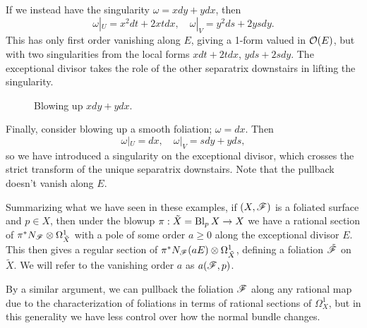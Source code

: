 \begin{example}
    If we instead have the singularity $\omega=xdy+ydx$, then
    \begin{equation*}
        \omega|_U = x^2dt + 2xtdx, \quad
        \omega|_V = y^2ds+2ysdy.
    \end{equation*}
    This has only first order vanishing along $E$, giving a 1-form valued in
    $\mathcal{O}(E)$, but with two singularities from the local forms $xdt+2tdx$,
    $yds+2sdy$. The exceptional divisor takes the role of the other separatrix
    downstairs in lifting the singularity.
    \begin{figure}[H]
        \centering
        \caption{Blowing up $xdy+ydx$.}
    \end{figure}
\end{example}

\begin{example}\label{ex:smooth blowup}
    Finally, consider blowing up a smooth foliation; $\omega=dx$. Then
    \begin{equation*}
        \omega|_U = dx, \quad \omega|_V = sdy+yds,
    \end{equation*}
    so we have introduced a singularity on the exceptional divisor, which
    crosses the strict transform of the unique separatrix downstairs. Note that
    the pullback doesn't vanish along $E$.
\end{example}

\begin{definition}
    Summarizing what we have seen in these examples, if $(X,\mathscr{F})$ is a
    foliated surface and $p\in X$, then under the blowup
    $\pi:\tilde X=\operatorname{Bl}_pX\to X$ we have a rational section of
    $\pi^*N_{\mathscr{F}}\otimes\Omega^1_{\tilde X}$ with a pole of some order $a\ge0$
    along the exceptional divisor $E$. This then gives a regular section of
    $\pi^*N_{\mathscr{F}}(aE)\otimes\Omega^1_{\tilde X}$, defining a foliation
    $\tilde{\mathscr{F}}$ on $\tilde X$. We will refer to the vanishing order $a$ as
    $a(\mathscr{F},p)$.
\end{definition}

\begin{remark}
    By a similar argument, we can pullback the foliation $\mathscr{F}$ along any
    rational map due to the characterization of foliations in terms of rational
    sections of $\Omega^1_X$, but in this generality we have less control over
    how the normal bundle changes.
\end{remark}

